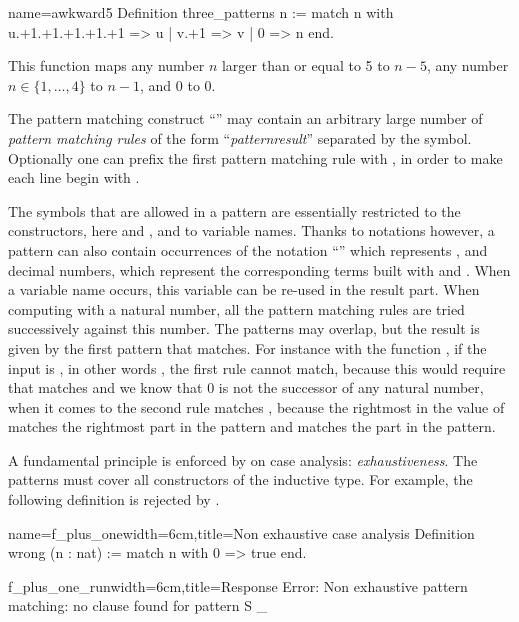 \begin{coq}{name=awkward5}{}
Definition three_patterns n :=
  match n with
    u.+1.+1.+1.+1.+1 => u
  | v.+1 => v
  | 0 => n
  end.
\end{coq}
This function maps any number \(n\) larger than or equal to 5 to \(n-5\),
any number \(n \in \{1, \ldots, 4\}\) to \(n-1\), and \(0\) to \(0\).

The pattern matching construct ``'' may contain an
arbitrary large number of {\em pattern matching rules} of the form
``\emph{pattern}\C{ =>$~$}\emph{result}''
separated by the \C{|} symbol.  Optionally one can
prefix the first pattern matching rule with \C{|}, in order to make each line
begin with \C{|}.

The symbols that are allowed in a pattern are essentially restricted
to the constructors, here  and , and to variable names.
Thanks to notations however, a pattern can also contain
occurrences of the notation ``'' which represents , and
decimal numbers, which represent the corresponding terms built with
 and .  When a variable name occurs, this variable can be
re-used in the result part.  When computing with a natural number, all
the pattern matching rules are tried successively against this number.  The
patterns may overlap, but the result is given by the first pattern that
matches.
For instance with the function , if the input is , in other words , the first
rule cannot match, because this would require that  matches
 and we know that \(0\) is not the successor of any
natural number, when it comes to the second rule  matches
, because the rightmost  in the value of  matches
the rightmost  part in the pattern and  matches the  part
in the pattern.

A fundamental principle is enforced by \Coq{} on case analysis:
\emph{exhaustiveness}.  The patterns must cover all constructors of
the inductive type.  For example, the following definition is
rejected by \Coq{}.

\begin{coq}{name=f_plus_one}{width=6cm,title=Non exhaustive case analysis}
Definition wrong (n : nat) :=
  match n with 0 => true end.
$~$
\end{coq}
\begin{coqout}{f_plus_one_run}{width=6cm,title=Response}
Error: Non exhaustive pattern
matching: no clause found for
pattern S _
\end{coqout}

